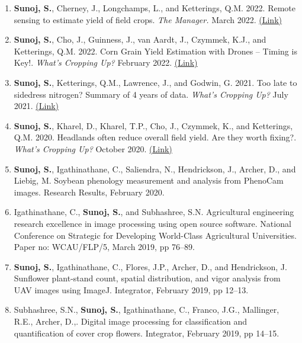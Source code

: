 \documentclass[11pt]{article}
\begin{document}
\begin{enumerate}[itemsep=-2pt]

\item \textbf{Sunoj, S.}, Cherney, J., Longchamps, L., and Ketterings, Q.M. 2022. Remote sensing to estimate yield of field crops. \textit{The Manager.} March 2022. \href{https://hdl.handle.net/1813/111143}{(Link)}


\item \textbf{Sunoj, S.}, Cho, J., Guinness, J., van Aardt, J., Czymmek, K.J., and Ketterings, Q.M. 2022. Corn Grain Yield Estimation with Drones – Timing is Key!. \textit{What's Cropping Up?} February 2022. \href{https://blogs.cornell.edu/whatscroppingup/}{(Link)}

\item \textbf{Sunoj, S.}, Ketterings, Q.M., Lawrence, J., and Godwin, G. 2021. Too late to sidedress nitrogen? Summary of 4 years of data. \textit{What's Cropping Up?} July 2021. \href{https://blogs.cornell.edu/whatscroppingup/2021/07/26/too-late-to-sidedress-nitrogen-\%E2\%88\%92-summary-of-4-years-of-data/}{(Link)}

\item \textbf{Sunoj, S.}, Kharel, D., Kharel, T.{P}., Cho, J., Czymmek, K., and Ketterings, Q.M. 2020. Headlands often reduce overall field yield. Are they worth fixing?. \textit{What's Cropping Up?} October 2020. \href{http://blogs.cornell.edu/whatscroppingup/2020/10/20/headlands-often-reduce-overall-field-yield-are-they-worth-fixing/}{(Link)}

\item \textbf{Sunoj, S.}, Igathinathane, C., Saliendra, N., Hendrickson, J., Archer, D., and Liebig, M. Soybean phenology measurement and analysis from PhenoCam images. Research Results, February 2020.

\item Igathinathane, C., \textbf{Sunoj, S.}, and Subhashree, S.N. Agricultural engineering research excellence in image processing using open source software. National Conference on Strategic for Developing World-Class Agricultural Universities. Paper no: WCAU/FLP/5, March 2019, pp 76--89.

\item \textbf{Sunoj, S.}, Igathinathane, C., Flores, J.P., Archer, D., and Hendrickson, J. Sunflower plant-stand count, spatial distribution, and vigor analysis from UAV images using ImageJ. Integrator, February 2019, pp 12--13.

\item Subhashree, S.N., \textbf{Sunoj, S.}, Igathinathane, C., Franco, J.G., Mallinger, R.E., Archer, D.,. Digital image processing for classification and quantification of cover crop flowers. Integrator, February 2019, pp 14--15.


\end{enumerate}
\end{document}
